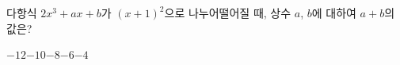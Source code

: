 다항식 $2x^3+ax+b$가 $(x+1)^2$으로 나누어떨어질 때, 상수 $a$, $b$에 대하여 $a+b$의 값은?
\begin{choices32}{$-12$}{$-10$}{$-8$}{$-6$}{$-4$}\end{choices32}
